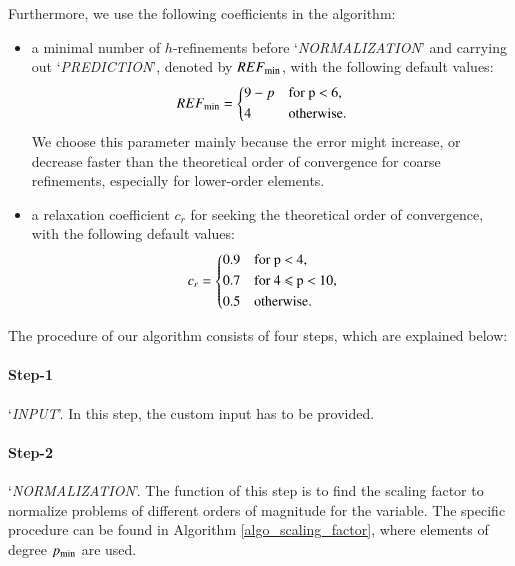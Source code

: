 \documentclass[review,3p]{elsarticle}
\begin{document}
Furthermore, we use the following coefficients in the algorithm:		%
\begin{itemize}
  \renewcommand\labelitemi{--}
  \item a minimal number of $h$-refinements before `\textit{NORMALIZATION}' and carrying out `\textit{PREDICTION}', denoted by $REF_{\rm min}$, with the following default values:
  \begin{equation}
  \begin{aligned}
      REF_{\rm min} &=
      \begin{cases*}
	9-p & for p $<$ 6, \\
	4 & otherwise.
      \end{cases*}
  \end{aligned}
  \end{equation} 
  We choose this parameter mainly because the error might increase, or decrease faster than the theoretical order of convergence for coarse refinements, especially for lower-order elements.
  \item a relaxation coefficient $c_r$ for seeking the theoretical order of convergence, with the following default values: 
    \begin{equation}
    \begin{aligned}
	c_r &=
	\begin{cases*}
	  0.9 & for p $<$ 4, \\
	  0.7 & for 4 $\leqslant$ p $<$ 10, \\
	  0.5 & otherwise.
	\end{cases*}
    \end{aligned}
    \end{equation}
\end{itemize}

The procedure of our algorithm consists of four steps, which are explained below:

\paragraph{Step-1} `\textit{INPUT}'. In this step, the custom input has to be provided.
\paragraph{Step-2} `\textit{NORMALIZATION}'. The function of this step is to find the scaling factor to normalize problems of different orders of magnitude for the variable. The specific procedure can be found in Algorithm \ref{algo_scaling_factor}, where elements of degree $p_{\rm min}$ are used. 
\end{document}
